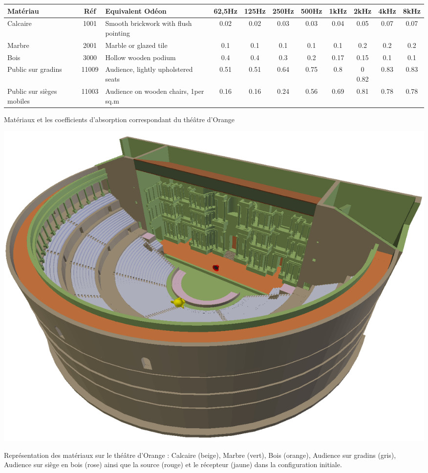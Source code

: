\begin{tableth} 
\footnotesize
	\begin{tabular}{| m{1.5cm} | c | m{1.7cm} | *{8}{c|}}
		\hline
		Matériau &Réf & Equivalent Odéon & 62,5Hz & 125Hz & 250Hz & 500Hz & 1kHz & 2kHz & 4kHz & 8kHz \\
		  \hline
		  \hline
		   Calcaire & 1001 & Smooth brickwork with flush pointing\footnotemark & 0.02&	0.02&	0.03&	0.03&	0.04&	0.05&	0.07&	0.07 \\
		   \hline
		Marbre &2001 & Marble or glazed tile\footnotemark & 0.1 & 0.1 & 0.1 & 0.1 & 0.1 & 0.2 & 0.2 & 0.2 \\
		   \hline
		Bois & 3000 & Hollow wooden podium\footnotemark & 0.4&0.4&0.3&	0.2&	0.17& 0.15& 0.1&	0.1 \\
		   \hline
		Public sur gradins & 11009 & Audience, lightly upholstered seats\footnotemark & 0.51&	0.51&	0.64&	0.75&	0.8&0	0.82&	0.83&	0.83 \\
	     \hline
	     	Public sur sièges mobiles & 11003 & Audience on wooden chairs, 1per sq.m\footnotemark & 0.16 & 0.16 & 0.24 & 0.56 & 0.69 & 0.81 & 0.78 & 0.78 \\
	     \hline

	 \end{tabular}
	\caption{Matériaux et les coefficients d'absorption correspondant du théâtre d'Orange}
	\label{matOdeon}
\end{tableth}
\addtocounter{footnote}{-1}
\addtocounter{footnote}{-1}
\addtocounter{footnote}{-1}
\addtocounter{footnote}{1}
\addtocounter{footnote}{1}

\begin{figureth}
	\includegraphics[width=\linewidth]{images/theatreMat}
	\caption{Représentation des matériaux sur le théâtre d'Orange : Calcaire (beige), Marbre (vert), Bois (orange), Audience sur gradins (gris), Audience sur siège en bois (rose) ainsi que la source (rouge) et le récepteur (jaune) dans la configuration initiale.}
	\label{theatreMat}
\end{figureth}

